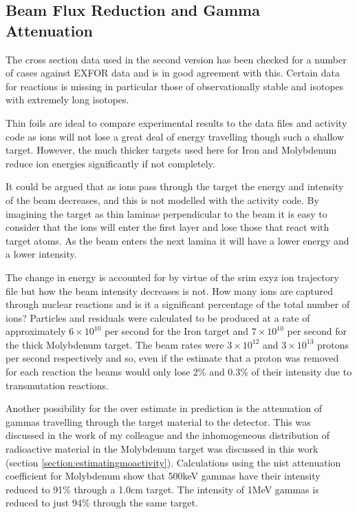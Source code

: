 \subsection{Beam Flux Reduction and Gamma Attenuation}

The cross section data used in the second version has been checked for a number of cases against EXFOR data and is in good agreement with this.  Certain data for reactions is missing in particular those of observationally stable and isotopes with extremely long isotopes.

Thin foils are ideal to compare experimental results to the data files and activity code as ions will not lose a great deal of energy travelling though such a shallow target.  However, the much thicker targets used here for Iron and Molybdenum reduce ion energies significantly if not completely.

It could be argued that as ions pass through the target the energy and intensity of the beam decreases, and this is not modelled with the activity code.  By imagining the target as thin laminae perpendicular to the beam it is easy to consider that the ions will enter the first layer and lose those that react with target atoms.  As the beam enters the next lamina it will have a lower energy and a lower intensity.

The change in energy is accounted for by virtue of the \acrshort{srim} exyz ion trajectory file but how the beam intensity decreases is not.  How many ions are captured through nuclear reactions and is it a significant percentage of the total number of ions?  Particles and residuals were calculated to be produced at a rate of approximately $6\times10^{10}$ per second for the Iron target and $7\times10^{10}$ per second for the thick Molybdenum target.  The beam rates were $3 \times 10^{12}$ and $3 \times 10^{13}$ protons per second respectively and so, even if the estimate that a proton was removed for each reaction the beams would only lose 2\% and 0.3\% of their intensity due to transmutation reactions.

Another possibility for the over estimate in prediction is the attenuation of gammas travelling through the target material to the detector.  This was discussed in the work of my colleague\cite{johnhewett} and the inhomogeneous distribution of radioactive material in the Molybdenum target was discussed in this work (section \ref{section:estimatingmoactivity}).  Calculations using the \acrshort{nist} attenuation coefficient for Molybdenum show that 500keV gammas have their intensity reduced to 91\% through a 1.0cm target.  The intensity of 1MeV gammas is reduced to just 94\% through the same target.

